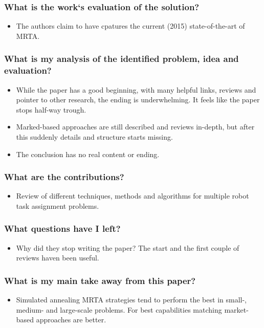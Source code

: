     \subsubsection*{What is the work`s evaluation of the solution?}
    \begin{itemize}
        \item The authors claim to have cpatures the current (2015) state-of-the-art of MRTA.
    \end{itemize}
    \subsubsection*{What is my analysis of the identified problem, idea and evaluation?}
    \begin{itemize}
        \item While the paper has a good beginning, with many helpful links, reviews and pointer to other research, the ending is underwhelming. It feels like the paper stops half-way trough. 
        \item Marked-based approaches are still described and reviews in-depth, but after this suddenly details and structure starts missing.
        \item The conclusion has no real content or ending.
    \end{itemize}
    \subsubsection*{What are the contributions?}
    \begin{itemize}
        \item Review of different techniques, methods and algorithms for multiple robot task assignment problems.
    \end{itemize}
    \subsubsection*{What questions have I left?}
    \begin{itemize}
        \item Why did they stop writing the paper? The start and the first couple of reviews haven been useful.
    \end{itemize}
    \subsubsection*{What is my main take away from this paper?}
    \begin{itemize}
        \item Simulated annealing MRTA strategies tend to perform the best in small-, medium- and large-scale problems. For best capabilities matching market-based approaches are better.
    \end{itemize}
    
